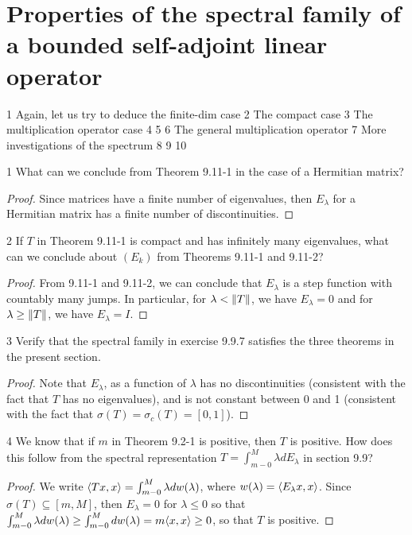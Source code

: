 \section{Properties of the spectral family of a bounded self-adjoint linear operator}

1 Again, let us try to deduce the finite-dim case 
2 The compact case 
3 The multiplication operator case 
4
5
6 The general multiplication operator
7 More investigations of the spectrum
8
9
10

\begin{exercise}{1}
What can we conclude from Theorem 9.11-1 in the case of a Hermitian matrix?
\end{exercise}
\begin{proof}
Since matrices have a finite number of eigenvalues, then $E_\lambda$ for a Hermitian matrix has a finite number of discontinuities.
\end{proof} 

\begin{exercise}{2}
If $T$ in Theorem 9.11-1 is compact and has infinitely many eigenvalues, what can we conclude about $(E_k)$ from Theorems 9.11-1 and 9.11-2?
\end{exercise}
\begin{proof}
From 9.11-1 and 9.11-2, we can conclude that $E_\lambda$ is a step function with countably many jumps.
In particular, for $\lambda < \left\lVert T\right\rVert$, we have $E_\lambda = 0$ and for $\lambda \geq \left\lVert T\right\rVert$, we have $E_\lambda = I$.
\end{proof} 

\begin{exercise}{3}
Verify that the spectral family in exercise 9.9.7 satisfies the three theorems in the present section.
\end{exercise}
\begin{proof}
Note that $E_\lambda$, as a function of $\lambda$ has no discontinuities (consistent with the fact that $T$ has no eigenvalues), and is not constant between 0 and 1 (consistent with the fact that $\sigma(T) = \sigma_c(T) = [0,1]$).
\end{proof} 

\begin{exercise}{4}
We know that if $m$ in Theorem 9.2-1 is positive, then $T$ is positive.
How does this follow from the spectral representation $T = \int_{m-0}^M \lambda dE_\lambda$ in section 9.9?
\end{exercise}
\begin{proof}
We write $\langle Tx, x\rangle = \int_{m-0}^M \lambda d w(\lambda)$, where $w(\lambda) = \langle E_\lambda x, x\rangle$.
Since $\sigma(T) \subseteq [m, M]$, then $E_\lambda = 0$ for $\lambda \leq 0$ so that $\int_{m-0}^M \lambda d w(\lambda) \geq \int_{m-0}^M d w(\lambda) = m \langle x, x\rangle \geq 0$, so that $T$ is positive.
\end{proof} 

